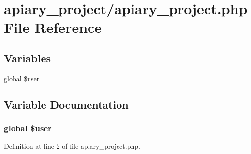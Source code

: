 \hypertarget{apiary__project_8php}{
\section{apiary_project/apiary\_\-project.php File Reference}
\label{apiary__project_8php}
}
\subsection*{Variables}
\begin{DoxyCompactItemize}
\item 
global \hyperlink{apiary__project_8php_a00365e6c5f70c43fb2ed86c9bc5626e0}{\$user}
\end{DoxyCompactItemize}


\subsection{Variable Documentation}
\hypertarget{apiary__project_8php_a00365e6c5f70c43fb2ed86c9bc5626e0}{
\subsubsection[{\$user}]{\setlength{\rightskip}{0pt plus 5cm}global \$user}}
\label{apiary__project_8php_a00365e6c5f70c43fb2ed86c9bc5626e0}


Definition at line 2 of file apiary\_\-project.php.

